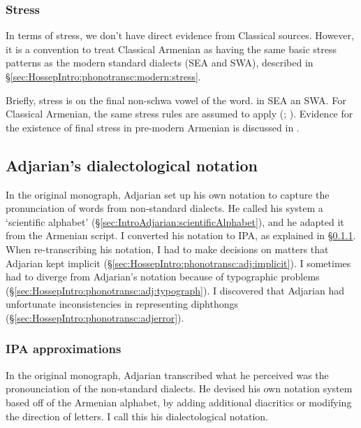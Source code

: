\subsubsection{Stress}\label{sec:HossepIntro:phonotransc:CA:stress}

 
In terms of stress, we don't have direct evidence from Classical sources. However, it is a convention to treat Classical Armenian as having the same basic stress patterns as the modern standard dialects (SEA and SWA), described in \S\ref{sec:HossepIntro:phonotransc:modern:stress}. 

Briefly, stress  is on the final non-schwa vowel of the word. in SEA an SWA. For Classical Armenian, the same stress rules are assumed to apply (\citealt[15]{Thomson-1989-IntroClassicalArmenian}; \citealt[1043-4]{Macak-2017-PhonoClassicalArmenian}). Evidence for the existence of final stress in pre-modern Armenian is discussed in \citet{DeLisi-2018-ArmenianProsodyDiachrony}.





\subsection{Adjarian's dialectological notation }\label{sec:HossepIntro:phonotransc:adj}


In the original monograph, Adjarian set up his own notation to capture the pronunciation of words from  non-standard dialects. He called his system a `scientific alphabet'  (\S\ref{sec:IntroAdjarian:scientificAlphabet}), and he adapted it from the Armenian script. I converted his notation to IPA, as explained in \S\ref{sec:HossepIntro:phonotransc:adj:ipa}. When re-transcribing his notation, I had to make decisions on matters that Adjarian kept implicit (\S\ref{sec:HossepIntro:phonotransc:adj:implicit}). I sometimes had to diverge from Adjarian's notation because of   typographic problems (\S\ref{sec:HossepIntro:phonotransc:adj:typograph}). I discovered that Adjarian had unfortunate inconsistencies in representing diphthongs (\S\ref{sec:HossepIntro:phonotransc:adjerror}). 


\subsubsection{IPA approximations}\label{sec:HossepIntro:phonotransc:adj:ipa}

In the original monograph, Adjarian transcribed what he perceived was the pronounciation of the non-standard dialects. He devised his own notation system based off of the Armenian alphabet, by adding additional diacritics or modifying the direction of letters. I call this his dialectological notation. 

